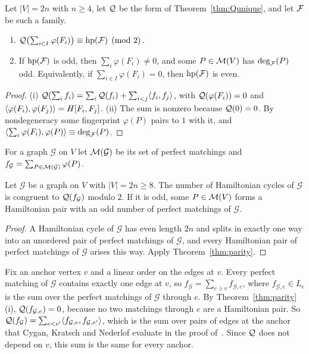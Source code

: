 \begin{theorem}\label{thm:parity}
Let $|V|=2n$ with $n\ge4$, let $\mathcal{Q}$ be the form of Theorem~\ref{thm:Qunique}, and let $\mathcal{F}$ be such a family.
\begin{enumerate}
\item $\mathcal{Q}\bigl(\sum_{i\in I}\varphi(F_i)\bigr)\equiv\operatorname{hp}(\mathcal{F})\pmod2$.
\item If $\operatorname{hp}(\mathcal{F})$ is odd, then $\sum_i\varphi(F_i)\ne0$, and some $P\in\mathcal{M}(V)$ has $\deg_{\mathcal{F}}(P)$ odd. Equivalently, if $\sum_{i\in I}\varphi(F_i)=0$, then $\operatorname{hp}(\mathcal{F})$ is even.
\end{enumerate}
\end{theorem}

\begin{proof}
(i) $\mathcal{Q}(\sum_{i}f_i)=\sum_i\mathcal{Q}(f_i)+\sum_{i<j}\langle f_i,f_j\rangle$, with $\mathcal{Q}(\varphi(F_i))=0$ and $\langle\varphi(F_i),\varphi(F_j)\rangle=H[F_i,F_j]$. (ii) The sum is nonzero because $\mathcal{Q}(0)=0$. By nondegeneracy some fingerprint $\varphi(P)$ pairs to $1$ with it, and $\langle\sum_i\varphi(F_i),\varphi(P)\rangle\equiv\deg_{\mathcal{F}}(P)$.
\end{proof}

For a graph $\mathcal G$ on $V$ let $\mathcal{M}(\mathcal G)$ be its set of perfect matchings and $f_{\mathcal G}=\sum_{P\in\mathcal{M}(\mathcal G)}\varphi(P)$.

\begin{corollary}\label{cor:hc}
Let $\mathcal G$ be a graph on $V$ with $|V|=2n\ge8$. The number of Hamiltonian cycles of $\mathcal G$ is congruent to $\mathcal{Q}(f_{\mathcal G})$ modulo $2$. If it is odd, some $P\in\mathcal{M}(V)$ forms a Hamiltonian pair with an odd number of perfect matchings of $\mathcal G$.
\end{corollary}

\begin{proof}
A Hamiltonian cycle of $\mathcal G$ has even length $2n$ and splits in exactly one way into an unordered pair of perfect matchings of $\mathcal G$, and every Hamiltonian pair of perfect matchings of $\mathcal G$ arises this way. Apply Theorem~\ref{thm:parity}.
\end{proof}

Fix an anchor vertex $v$ and a linear order on the edges at $v$. Every perfect matching of $\mathcal G$ contains exactly one edge at $v$, so $f_{\mathcal G}=\sum_{e\ni v}f_{\mathcal G,e}$, where $f_{\mathcal G,e}\in L_e$ is the sum over the perfect matchings of $\mathcal G$ through $e$. By Theorem~\ref{thm:parity}(i), $\mathcal{Q}(f_{\mathcal G,e})=0$, because no two matchings through $e$ are a Hamiltonian pair. So $\mathcal{Q}(f_{\mathcal G})=\sum_{e<e'}\langle f_{\mathcal G,e},f_{\mathcal G,e'}\rangle$, which is the sum over pairs of edges at the anchor that Cygan, Kratsch and Nederlof evaluate in the proof of~\cite[Lemma~3.6]{CKN18}. Since $\mathcal{Q}$ does not depend on $v$, this sum is the same for every anchor.

